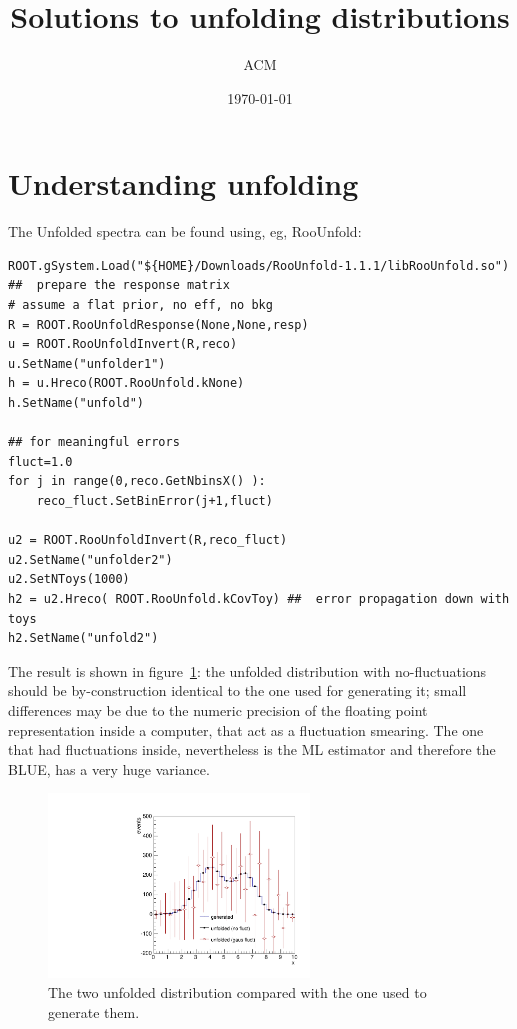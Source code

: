\documentclass[a4paper,11pt]{article}
\title{Solutions to unfolding distributions}
\author{ACM}
\date{\today}
\begin{document}
\maketitle

\section{Understanding unfolding}

The Unfolded spectra can be found using, eg, RooUnfold:
\begin{verbatim}
ROOT.gSystem.Load("${HOME}/Downloads/RooUnfold-1.1.1/libRooUnfold.so")
##  prepare the response matrix
# assume a flat prior, no eff, no bkg
R = ROOT.RooUnfoldResponse(None,None,resp)
u = ROOT.RooUnfoldInvert(R,reco)
u.SetName("unfolder1")
h = u.Hreco(ROOT.RooUnfold.kNone) 
h.SetName("unfold")

## for meaningful errors
fluct=1.0
for j in range(0,reco.GetNbinsX() ):
	reco_fluct.SetBinError(j+1,fluct)

u2 = ROOT.RooUnfoldInvert(R,reco_fluct)
u2.SetName("unfolder2")
u2.SetNToys(1000)
h2 = u2.Hreco( ROOT.RooUnfold.kCovToy) ##  error propagation down with toys
h2.SetName("unfold2")

\end{verbatim}

The result is shown in figure~\ref{fig:sol1}: the unfolded distribution with no-fluctuations should be by-construction identical to the one used for generating it; 
small differences may be due to the numeric precision of the floating point representation inside a computer, that act as a fluctuation smearing. 
The one that had fluctuations inside, nevertheless is the \gls{ML} estimator and therefore the \gls{BLUE}, has a very huge variance.

\begin{figure}[H]
	\centering
	\includegraphics[width=0.618\textwidth]{figs/gen-unfold.pdf}
	\caption{ \label{fig:sol1} The two unfolded distribution compared with the one used to generate them.}
\end{figure}
\end{document}
